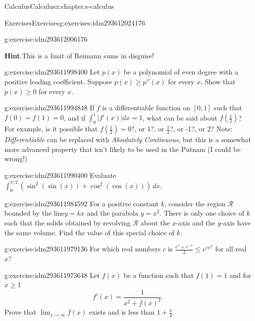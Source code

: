 \documentclass[twoside,10pt,]{book}
\newcommand{\blocktitlefont}{\relax}
\numberwithin{equation}{section}
\begin{document}
\begin{chapterptx}{Calculus}{}{Calculus}{}{}{x:chapter:s-calculus}
\begin{exercises-section}{Exercises}{}{Exercises}{}{}{g:exercises:idm293612024176}
\begin{divisionexercise}{4}{}{}{g:exercise:idm293612006176}
\par\smallskip%
\noindent\textbf{\blocktitlefont Hint}.\label{g:hint:idm293611999888}{}\hypertarget{g:hint:idm293611999888}{}\quad{}This is a limit of Reimann sums in disguise!%
\end{divisionexercise}%
\begin{divisionexercise}{5}{}{}{g:exercise:idm293611998400}%
Let \(p(x)\) be a polynomial of even degree with a positive leading coefficient. Suppose \(p(x)\geq p''(x)	\) for every \(x\). Show that \(p(x) \geq  0\) for every \(x\).%
\end{divisionexercise}%
\begin{divisionexercise}{6}{}{}{g:exercise:idm293611994848}%
If \(f\) is a differentiable function on \([0,1]\) such that \(f(0)=f(1)=0\), and if \(\int_0^1 \left| f'(x)\right| dx=1\), what can be said about \(f\left(\frac{1}{2}\right)\)? For example, is it possible that \(f\left(\frac{1}{2}\right)=0?\), or 1?, or \(\frac{1}{2}\)?, or -1?, or 2? Note: \emph{Differentiable} can be replaced with \emph{Absolutely Continuous}, but this is a somewhat more advanced property that isn't likely to be used in the Putnam (I could be wrong!)%
\end{divisionexercise}%
\begin{divisionexercise}{7}{}{}{g:exercise:idm293611990400}%
Evaluate \(\int_{ 0}^{ \pi /2} \left(\sin ^2(\sin (x))+\cos ^2(\cos (x))\right) \, dx\).%
\end{divisionexercise}%
\begin{divisionexercise}{8}{}{}{g:exercise:idm293611984592}%
For a positive constant \(k\), consider the region \(\mathcal{R}\) bounded by the line\(y = k x\) and the parabola \(y = x^2\). There is only one choice of \(k\) such that the solids obtained by revolving \(\mathcal{R}\) about the \(x\)-axis and the \(y\)-axis have the same volume. Find the value of this special choice of \(k\).%
\end{divisionexercise}%
\begin{divisionexercise}{9}{}{}{g:exercise:idm293611979136}%
For which real numbers \(c\) is \(\frac{e^x+ e^{-x}}{2}\leq e^{c x^2}\) for all real \(x\)?%
\end{divisionexercise}%
\begin{divisionexercise}{10}{}{}{g:exercise:idm293611973648}%
Let \(f(x)\) be a function such that \(f(1)=1\) and for \(x\geq 1\)%
\begin{equation*}
f'(x)=\frac{1}{x^2+ f(x)^2}\text{.}
\end{equation*}
Prove that \(\lim_{x\to \infty } f(x)\) exists and is less than \(1+\frac{\pi}{4}\).%

\end{divisionexercise}
\end{exercises-section}
\end{chapterptx}
\end{document}
